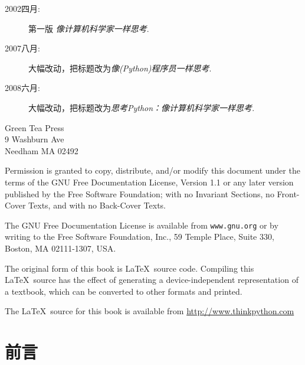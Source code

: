 \begin{latexonly}
{\begin{description}

\item[2002四月:] 第一版 {\em 像计算机科学家一样思考}.
\item[2007八月:] 大幅改动，把标题改为{\em 像(Python)程序员一样思考}.
\item[2008六月:] 大幅改动，把标题改为{\em 思考Python：像计算机科学家一样思考}.
\end{description}

\vspace{0.2in}

\begin{flushleft}  %
Green Tea Press \\
9 Washburn Ave\\
Needham MA 02492
\end{flushleft}


Permission is granted to copy, distribute, and/or modify this document
under the terms of the GNU Free Documentation License, Version 1.1 or
any later version published by the Free Software Foundation; with no
Invariant Sections, no Front-Cover Texts, and with no Back-Cover Texts.

The GNU Free Documentation License is available from {\tt www.gnu.org}
or by writing to the Free Software Foundation, Inc., 59 Temple Place,
Suite 330, Boston, MA 02111-1307, USA.

The original form of this book is \LaTeX\ source code.  Compiling this
\LaTeX\ source has the effect of generating a device-independent
representation of a textbook, which can be converted to other formats
and printed.

The \LaTeX\ source for this book is available from
\url{http://www.thinkpython.com}
\vspace{0.2in}
}

\end{latexonly}


\begin{htmlonly}


{\Large \thetitle}
\{\Large  Allen B.Downet}
\{\Large  翻译:Walter Lewis}

Version \theversion

\setcounter{chapter}{-1}
\end{htmlonly}

\chapter{前言}

